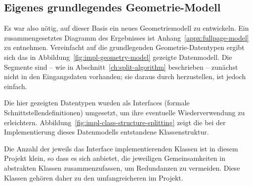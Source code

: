 \documentclass[../main/thesis.tex]{subfiles}
\begin{document}
\subsection{Eigenes grundlegendes Geometrie-Modell}
\label{ch:data-structures-new}

Es war also nötig, auf dieser Basis ein neues Geometriemodell zu entwickeln.
Ein zusammengesetztes Diagramm des Ergebnisses ist Anhang~\ref{appx:fullpage-model} zu entnehmen.
Vereinfacht auf die grundlegenden Geometrie-Datentypen ergibt sich das in Abbildung~\ref{fig:impl-geometry-model} gezeigte Datenmodell.
Die Segmente sind -- wie in Abschnitt~\ref{ch:split-algorithm} beschrieben -- zunächst nicht in den Eingangsdaten vorhanden; sie daraus durch  herzustellen, ist jedoch einfach.



Die hier gezeigten Datentypen wurden als Interfaces (formale Schnittstellendefinitionen) umgesetzt, um ihre eventuelle Wiederverwendung zu erleichtern. 
Abbildung~\ref{fig:impl-class-structure-splitting} zeigt die bei der Implementierung dieses Datenmodells entstandene Klassenstruktur.


Die Anzahl der jeweils das Interface implementierenden Klassen ist in diesem Projekt klein, so dass es sich anbietet, die jeweiligen Gemeinsamkeiten in abstrakten Klassen
zusammenzufassen, um Redundanzen zu vermeiden.
Diese Klassen gehören daher zu den umfangreicheren im Projekt.
\end{document}
